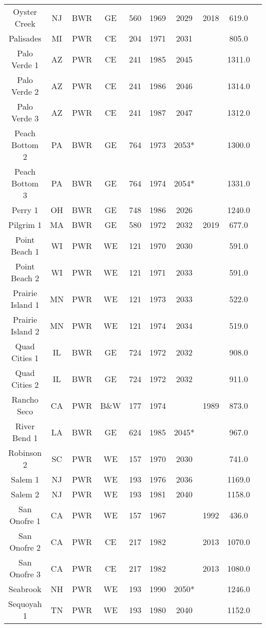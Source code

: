 \begin{table}[h!]
\begin{tabular}{c c c c c c c c c c}
    Oyster Creek & NJ & BWR & GE & 560 & 1969 & 2029 & 2018 & 619.0 \\
    Palisades & MI & PWR & CE & 204 & 1971 & 2031 &  & 805.0 \\
    Palo Verde 1 & AZ & PWR & CE & 241 & 1985 & 2045 &  & 1311.0 \\
    Palo Verde 2 & AZ & PWR & CE & 241 & 1986 & 2046 &  & 1314.0 \\
    Palo Verde 3 & AZ & PWR & CE & 241 & 1987 & 2047 &  & 1312.0 \\
    Peach Bottom 2 & PA & BWR & GE & 764 & 1973 & 2053* &  & 1300.0 \\
    Peach Bottom 3 & PA & BWR & GE & 764 & 1974 & 2054* &  & 1331.0 \\
    Perry 1 & OH & BWR & GE & 748 & 1986 & 2026 &  & 1240.0 \\
    Pilgrim 1 & MA & BWR & GE & 580 & 1972 & 2032 & 2019 & 677.0 \\
    Point Beach 1 & WI & PWR & WE & 121 & 1970 & 2030 &  & 591.0 \\
    Point Beach 2 & WI & PWR & WE & 121 & 1971 & 2033 &  & 591.0 \\
    Prairie Island 1 & MN & PWR & WE & 121 & 1973 & 2033 &  & 522.0 \\
    Prairie Island 2 & MN & PWR & WE & 121 & 1974 & 2034 &  & 519.0 \\
    Quad Cities 1 & IL & BWR & GE & 724 & 1972 & 2032 &  & 908.0 \\
    Quad Cities 2 & IL & BWR & GE & 724 & 1972 & 2032 &  & 911.0 \\
    Rancho Seco & CA & PWR & B\&W & 177 & 1974 &  & 1989 & 873.0 \\
    River Bend 1 & LA & BWR & GE & 624 & 1985 & 2045* &  & 967.0 \\
    Robinson 2 & SC & PWR & WE & 157 & 1970 & 2030 &  & 741.0 \\
    Salem 1 & NJ & PWR & WE & 193 & 1976 & 2036 &  & 1169.0 \\
    Salem 2 & NJ & PWR & WE & 193 & 1981 & 2040 &  & 1158.0 \\
    San Onofre 1 & CA & PWR & WE & 157 & 1967 &  & 1992 & 436.0 \\
    San Onofre 2 & CA & PWR & CE & 217 & 1982 &  & 2013 & 1070.0 \\
    San Onofre 3 & CA & PWR & CE & 217 & 1982 &  & 2013 & 1080.0 \\
    Seabrook & NH & PWR & WE & 193 & 1990 & 2050* &  & 1246.0 \\
    Sequoyah 1 & TN & PWR & WE & 193 & 1980 & 2040 &  & 1152.0 \\

\end{tabular}
\end{table}
